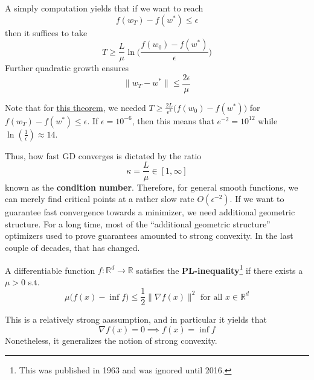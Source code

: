 	A simply computation yields that if we want to reach 
	\begin{equation}
	  f(w_T) - f(w^\ast) \leq \epsilon
	\end{equation}
	then it suffices to take 
	\begin{equation}
		T \geq \frac{L}{\mu} \ln\bigg( \frac{f(w_0) - f(w^\ast)}{\epsilon} \bigg)
	\end{equation}
	Further quadratic growth ensures 
	\begin{equation}
		\|w_T - w^\ast\| \leq \frac{2 \epsilon}{\mu}
	\end{equation}

	Note that for \hyperref[thm:convergence_to_criticality_gd]{this theorem}, we needed $T \geq \frac{2L}{\epsilon^2} \big( f(w_0) - f(w^\ast) \big)$ for $f(w_T) - f(w^\ast) \leq \epsilon$. If $\epsilon = 10^{-6}$, then this means that $e^{-2} = 10^12$ while $\ln(\frac{1}{\epsilon}) \approx 14$. 

	Thus, how fast GD converges is dictated by the ratio 
	\begin{equation}
		\kappa = \frac{L}{\mu} \in [1, \infty]
	\end{equation}
	known as the \textbf{condition number}. Therefore, for general smooth functions, we can merely find critical points at a rather slow rate $O(\epsilon^{-2})$. If we want to guarantee fast convergence towards a minimizer, we need additional geometric structure. For a long time, most of the ``additional geometric structure'' optimizers used to prove guarantees amounted to strong convexity. In the last couple of decades, that has changed. 

	\begin{definition}
		A differentiable function $f: \mathbb{R}^d \to \mathbb{R}$ satisfies the \textbf{PL-inequality}\footnote{This was published in 1963 and was ignored until 2016.} if there exists a $\mu > 0$ s.t. 
		\begin{equation}
			\mu \big( f(x) - \inf{f} \big) \leq \frac{1}{2} \| \nabla f(x) \|^2 \text{ for all } x \in \mathbb{R}^d
		\end{equation}
	\end{definition}

	This is a relatively strong aassumption, and in particular it yields that 
	\begin{equation}
		\nabla f(x) = 0 \implies f(x) = \inf{f}
	\end{equation}
	Nonetheless, it generalizes the notion of strong convexity. 

